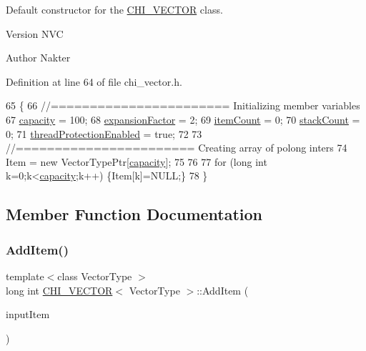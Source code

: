 Default constructor for the \hyperlink{class_c_h_i___v_e_c_t_o_r}{C\+H\+I\+\_\+\+V\+E\+C\+T\+OR} class.

\begin{DoxyVersion}{Version}
N\+VC 
\end{DoxyVersion}
\begin{DoxyAuthor}{Author}
Nakter 
\end{DoxyAuthor}


Definition at line 64 of file chi\+\_\+vector.\+h.


\begin{DoxyCode}
65 \{
66     \textcolor{comment}{//======================= Initializing member variables}
67     \hyperlink{class_c_h_i___v_e_c_t_o_r_ae73d9f91b472ae07bc32236605934ddb}{capacity} = 100;
68     \hyperlink{class_c_h_i___v_e_c_t_o_r_a587c8d362d5149da97ec6519430c4747}{expansionFactor} = 2;
69     \hyperlink{class_c_h_i___v_e_c_t_o_r_a0d37a8a4650059da0888be2d9c38487a}{itemCount} = 0;
70     \hyperlink{class_c_h_i___v_e_c_t_o_r_a91ef30712b0ead293dfe1adc29fee555}{stackCount} = 0;
71     \hyperlink{class_c_h_i___v_e_c_t_o_r_a4c99e660a5201e6f11986b68ab78d468}{threadProtectionEnabled} = \textcolor{keyword}{true};
72 
73     \textcolor{comment}{//======================= Creating array of polong inters}
74     Item = \textcolor{keyword}{new} VectorTypePtr[\hyperlink{class_c_h_i___v_e_c_t_o_r_ae73d9f91b472ae07bc32236605934ddb}{capacity}];
75 
76     
77     \textcolor{keywordflow}{for} (\textcolor{keywordtype}{long} \textcolor{keywordtype}{int} k=0;k<\hyperlink{class_c_h_i___v_e_c_t_o_r_ae73d9f91b472ae07bc32236605934ddb}{capacity};k++) \{Item[k]=NULL;\}
78 \}
\end{DoxyCode}


\subsection{Member Function Documentation}
\mbox{\label{class_c_h_i___v_e_c_t_o_r_a600ac6f3c5a721bd0d337f023624964c_a600ac6f3c5a721bd0d337f023624964c}} 
\subsubsection{\texorpdfstring{Add\+Item()}{AddItem()}}
{\footnotesize\ttfamily template$<$class Vector\+Type $>$ \\
long int \hyperlink{class_c_h_i___v_e_c_t_o_r}{C\+H\+I\+\_\+\+V\+E\+C\+T\+OR}$<$ Vector\+Type $>$\+::Add\+Item (\begin{DoxyParamCaption}\item[{Vector\+Type\+Ptr}]{input\+Item }\end{DoxyParamCaption})}

